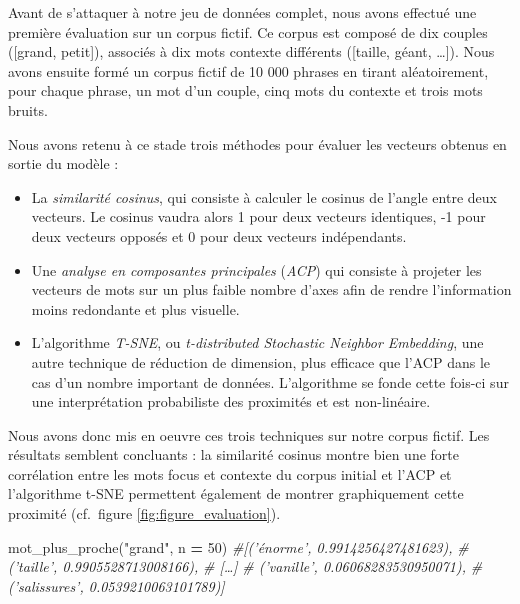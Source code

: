 \documentclass[11pt,french,french]{article}
\newenvironment{Shaded}{\begin{snugshade}}{\end{snugshade}}
\newcommand{\CommentTok}[1]{\textcolor[rgb]{0.56,0.35,0.01}{\textit{#1}}}
\newcommand{\DecValTok}[1]{\textcolor[rgb]{0.00,0.00,0.81}{#1}}
\newcommand{\NormalTok}[1]{#1}
\newcommand{\OperatorTok}[1]{\textcolor[rgb]{0.81,0.36,0.00}{\textbf{#1}}}
\newcommand{\StringTok}[1]{\textcolor[rgb]{0.31,0.60,0.02}{#1}}
\begin{document}
Avant de s'attaquer à notre jeu de données complet, nous avons effectué
une première évaluation sur un corpus fictif. Ce corpus est composé de
dix couples ({[}grand, petit{]}), associés à dix mots contexte
différents ({[}taille, géant, \ldots{}{]}). Nous avons ensuite formé un
corpus fictif de 10 000 phrases en tirant aléatoirement, pour chaque
phrase, un mot d'un couple, cinq mots du contexte et trois mots bruits.

Nous avons retenu à ce stade trois méthodes pour évaluer les vecteurs
obtenus en sortie du modèle :

\begin{itemize}
\item
  La \emph{similarité cosinus}, qui consiste à calculer le cosinus de
  l'angle entre deux vecteurs. Le cosinus vaudra alors 1 pour deux
  vecteurs identiques, -1 pour deux vecteurs opposés et 0 pour deux
  vecteurs indépendants.
\item
  Une \emph{analyse en composantes principales} (\emph{ACP}) qui
  consiste à projeter les vecteurs de mots sur un plus faible nombre
  d'axes afin de rendre l'information moins redondante et plus visuelle.
\item
  L'algorithme \emph{T-SNE}, ou \emph{t-distributed Stochastic Neighbor
  Embedding}, une autre technique de réduction de dimension, plus
  efficace que l'ACP dans le cas d'un nombre important de données.
  L'algorithme se fonde cette fois-ci sur une interprétation
  probabiliste des proximités et est non-linéaire.
\end{itemize}

Nous avons donc mis en oeuvre ces trois techniques sur notre corpus
fictif. Les résultats semblent concluants : la similarité cosinus montre
bien une forte corrélation entre les mots focus et contexte du corpus
initial et l'ACP et l'algorithme t-SNE permettent également de montrer
graphiquement cette proximité (cf.~figure \ref{fig:figure_evaluation}).

\footnotesize

\begin{Shaded}
\begin{Highlighting}[]
\NormalTok{mot_plus_proche(}\StringTok{"grand"}\NormalTok{, n }\OperatorTok{=} \DecValTok{50}\NormalTok{)}
\CommentTok{#[('énorme', 0.9914256427481623),}
\CommentTok{# ('taille', 0.9905528713008166),}
\CommentTok{# […]}
\CommentTok{# ('vanille', 0.06068283530950071),}
\CommentTok{# ('salissures', 0.0539210063101789)]}
\end{Highlighting}
\end{Shaded}
\end{document}
